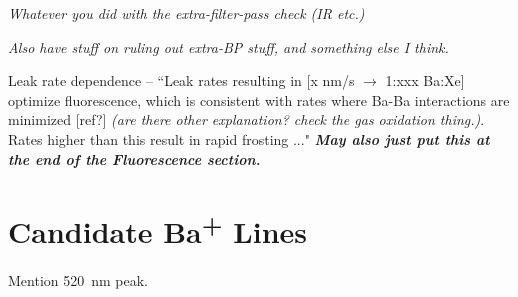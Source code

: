 \emph{\color{gray}Whatever you did with the extra-filter-pass check (IR etc.)}

\emph{\color{gray}Also have stuff on ruling out extra-BP stuff, and something else I think.}

Leak rate dependence -- ``Leak rates resulting in [x nm/s $\rightarrow$ 1:xxx Ba:Xe] optimize fluorescence, which is consistent with rates where Ba-Ba interactions are minimized [ref?] \emph{\color{gray}(are there other explanation?  check the gas oxidation thing.)}.  Rates higher than this result in rapid frosting ..." \emph{\textbf{\color{gray}May also just put this at the end of the  Fluorescence section.}}

\section{Candidate Ba\textsuperscript{+} Lines}
\label{sec:BaPlus}

Mention 520~nm peak.